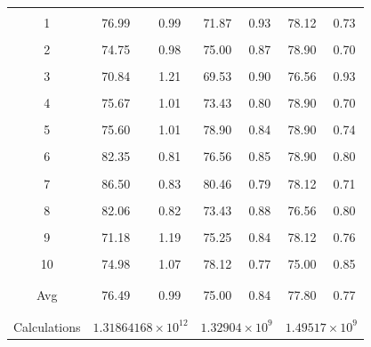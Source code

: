 \documentclass{report}
\begin{document}
\begin{table}
\begin{center}
\begin{tabular}{c|c|c|c|c|c|c}
			\\&&&&&&	\\
			\hline &&&&&&\\
			1 & 76.99 &    0.99 & 71.87 &  0.93  &  78.12  &  0.73	\\&&&&&&	\\
			2 & 74.75 &    0.98  & 75.00 &   0.87&  78.90  & 0.70	\\&&&&&&	\\
			3 & 70.84 &    1.21 & 69.53 &  0.90 &  76.56  & 0.93	\\&&&&&&	\\
			4 & 75.67 &    1.01  & 73.43 &  0.80 &  78.90  & 0.70	\\&&&&&&	\\
			5 & 75.60 &    1.01  & 78.90 &  0.84 &  78.90  &  0.74	\\&&&&&&	\\
			6 & 82.35 &    0.81  & 76.56 & 0.85  &  78.90  & 0.80	\\&&&&&&	\\
			7 & 86.50 &    0.83  & 80.46 & 0.79  &  78.12  &  0.71	\\&&&&&&	\\
			8 & 82.06 &    0.82  & 73.43 & 0.88  &  76.56  &  0.80	\\&&&&&&	\\
			9 & 71.18 &    1.19  & 75.25 & 0.84  &  78.12  & 0.76	\\&&&&&&	\\
			10 & 74.98 &    1.07 & 78.12    &  0.77   &  75.00  & 0.85	\\&&&&&&	\\
			\hline 	&&&&&&	\\
			Avg
			& 76.49 & 0.99    & 75.00 & 0.84  & 77.80 & 0.77 \\	&&&&&&	\\
			\hline 		\\
			
			Calculations
			
			&\multicolumn{2}{c}{$1.31864168 \times 10^{12}$ }& \multicolumn{2}{c}{$1.32904 \times 10^9$}&
			\multicolumn{2}{c}{$1.49517 \times 10^9$}
			
			\\
		\end{tabular}
		
	\end{center}
\end{table}
\end{document}

